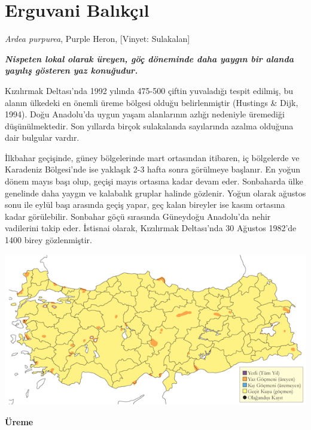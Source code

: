\documentclass[
  a4paper,
  DIV=11,
  numbers=noendperiod]{scrreprt}
\begin{document}
\section{Erguvani Balıkçıl}\label{erguvani-balux131kuxe7ux131l}

\emph{Ardea purpurea}, Purple Heron, {[}Vinyet: Sulakalan{]}

\textbf{\emph{Nispeten lokal olarak üreyen, göç döneminde daha yaygın
bir alanda yayılış gösteren yaz konuğudur.}}

Kızılırmak Deltası'nda 1992 yılında 475-500 çiftin yuvaladığı tespit
edilmiş, bu alanın ülkedeki en önemli üreme bölgesi olduğu
belirlenmiştir (Hustings \& Dijk, 1994). Doğu Anadolu'da uygun yaşam
alanlarının azlığı nedeniyle üremediği düşünülmektedir. Son yıllarda
birçok sulakalanda sayılarında azalma olduğuna dair bulgular vardır.

İlkbahar geçişinde, güney bölgelerinde mart ortasından itibaren, iç
bölgelerde ve Karadeniz Bölgesi'nde ise yaklaşık 2-3 hafta sonra
görülmeye başlanır. En yoğun dönem mayıs başı olup, geçişi mayıs
ortasına kadar devam eder. Sonbaharda ülke genelinde daha yaygın ve
kalabalık gruplar halinde gözlenir. Yoğun olarak ağustos sonu ile eylül
başı arasında geçiş yapar, geç kalan bireyler ise kasım ortasına kadar
görülebilir. Sonbahar göçü sırasında Güneydoğu Anadolu'da nehir
vadilerini takip eder. İstisnai olarak, Kızılırmak Deltası'nda 30
Ağustos 1982'de 1400 birey gözlenmiştir.

\includegraphics{images/harita_Page_070.png}

\textbf{Üreme}
\end{document}
